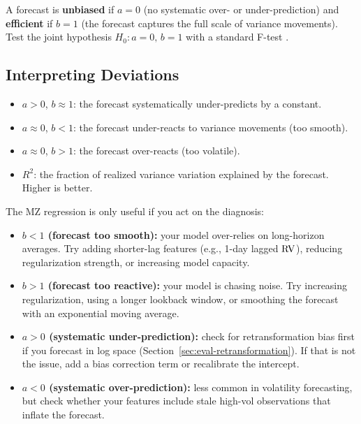 \begin{definition}
A forecast is \textbf{unbiased} if $a = 0$ (no systematic over- or under-prediction) and \textbf{efficient} if $b = 1$ (the forecast captures the full scale of variance movements).
Test the joint hypothesis $H_0: a = 0, \, b = 1$ with a standard F-test \citep{MincerZarnowitz1969}.
\end{definition}

\subsection{Interpreting Deviations}

\begin{itemize}[nosep]
  \item $a > 0$, $b \approx 1$: the forecast systematically under-predicts by a constant.
  \item $a \approx 0$, $b < 1$: the forecast under-reacts to variance movements (too smooth).
  \item $a \approx 0$, $b > 1$: the forecast over-reacts (too volatile).
  \item $R^2$: the fraction of realized variance variation explained by the forecast. Higher is better.
\end{itemize}

\begin{keyidea}
The MZ regression is only useful if you act on the diagnosis:
\begin{itemize}[nosep]
  \item \textbf{$b < 1$ (forecast too smooth):} your model over-relies on long-horizon averages. Try adding shorter-lag features (e.g., 1-day lagged $\operatorname{RV}$), reducing regularization strength, or increasing model capacity.
  \item \textbf{$b > 1$ (forecast too reactive):} your model is chasing noise. Try increasing regularization, using a longer lookback window, or smoothing the forecast with an exponential moving average.
  \item \textbf{$a > 0$ (systematic under-prediction):} check for retransformation bias first if you forecast in log space (Section~\ref{sec:eval-retransformation}). If that is not the issue, add a bias correction term or recalibrate the intercept.
  \item \textbf{$a < 0$ (systematic over-prediction):} less common in volatility forecasting, but check whether your features include stale high-vol observations that inflate the forecast.
\end{itemize}
\end{keyidea}

